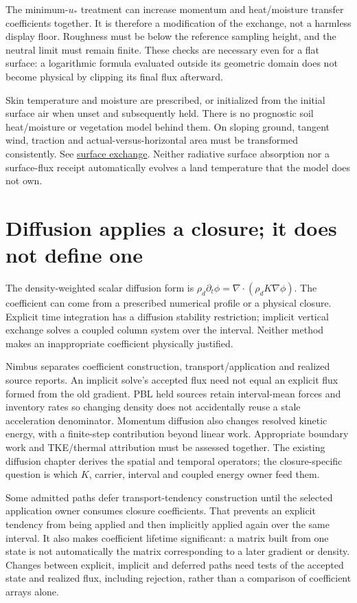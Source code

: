 The minimum-$u_*$ treatment can increase momentum and heat/moisture transfer
coefficients together. It is therefore a modification of the exchange, not a
harmless display floor. Roughness must be below the reference sampling height,
and the neutral limit must remain finite. These checks are necessary even for
a flat surface: a logarithmic formula evaluated outside its geometric domain
does not become physical by clipping its final flux afterward.

Skin temperature and moisture are prescribed, or initialized from the initial
surface air when unset and subsequently held. There is no prognostic soil
heat/moisture or vegetation model behind them. On sloping ground, tangent wind,
traction and actual-versus-horizontal area must be transformed consistently.
See \href{../src/boundary_layer/base/surface_fluxes.cpp}{surface exchange}.
Neither radiative surface absorption nor a surface-flux receipt automatically
evolves a land temperature that the model does not own.

\section{Diffusion applies a closure; it does not define one}

The density-weighted scalar diffusion form is
$\rho_d\partial_t\phi=\nabla\!\cdot(\rho_dK\nabla\phi)$.
The coefficient can come from a prescribed numerical profile or a physical
closure. Explicit time integration has a diffusion stability restriction;
implicit vertical exchange solves a coupled column system over the interval.
Neither method makes an inappropriate coefficient physically justified.

Nimbus separates coefficient construction, transport/application and realized
source reports. An implicit solve's accepted flux need not equal an explicit
flux formed from the old gradient. PBL held sources retain interval-mean
forces and inventory rates so changing density does not accidentally reuse a
stale acceleration denominator. Momentum diffusion also changes resolved
kinetic energy, with a finite-step contribution beyond linear work. Appropriate
boundary work and TKE/thermal attribution must be assessed together.
The existing diffusion chapter derives the spatial and temporal operators;
the closure-specific question is which $K$, carrier, interval and coupled
energy owner feed them.

Some admitted paths defer transport-tendency construction until the selected
application owner consumes closure coefficients. That prevents an explicit
tendency from being applied and then implicitly applied again over the same
interval. It also makes coefficient lifetime significant: a matrix built from
one state is not automatically the matrix corresponding to a later gradient
or density. Changes between explicit, implicit and deferred paths need tests
of the accepted state and realized flux, including rejection, rather than a
comparison of coefficient arrays alone.

